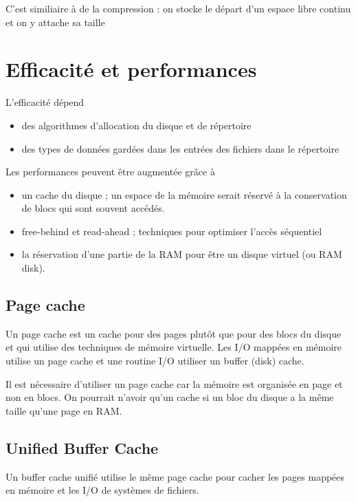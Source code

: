 	C'est similiaire à de la compression : on stocke le départ d'un espace libre continu et on y attache sa taille
	
\section{Efficacité et performances}

L'efficacité dépend

\begin{itemize}
	\item des algorithmes d'allocation du disque et de répertoire
	\item des types de données gardées dans les entrées des fichiers dans le répertoire
\end{itemize}

Les performances peuvent être augmentée grâce à

\begin{itemize}
	\item un cache du disque ; un espace de la mémoire serait réservé à la conservation de blocs qui sont souvent accédés.
	\item free-behind et read-ahead ; techniques pour optimiser l'accès séquentiel
	\item la réservation d'une partie de la RAM pour être un disque virtuel (ou RAM disk).
\end{itemize}

	\subsection{Page cache}
	
	Un page cache est un cache pour des pages plutôt que pour des blocs du disque et qui utilise des techniques de mémoire virtuelle. Les I/O mappées en mémoire utilise un page cache et une routine I/O utiliser un buffer (disk) cache.
	
	
	Il est nécessaire d'utiliser un page cache car la mémoire est organisée en page et non en blocs. On pourrait n'avoir qu'un cache si un bloc du disque a la même taille qu'une page en RAM.

	\subsection{Unified Buffer Cache}
	
	Un buffer cache unifié utilise le même page cache pour cacher les pages mappées en mémoire et les I/O de systèmes de fichiers.
	
